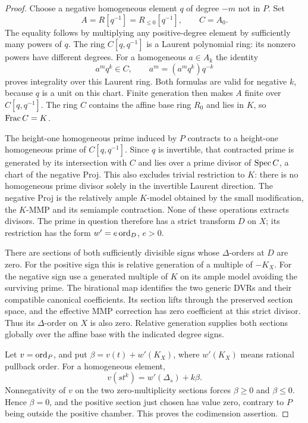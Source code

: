 \begin{proof}
Choose a negative homogeneous element $q$ of degree $-m$ not in $P$.
Set
\[
 A=R[q^{-1}]=R_{\le0}[q^{-1}],\qquad C=A_0.
\]
The equality follows by multiplying any positive-degree element by
sufficiently many powers of $q$.  The ring
$C[q,q^{-1}]$ is a Laurent polynomial ring: its nonzero powers have
different degrees.  For a homogeneous $a\in A_k$ the identity
\begin{equation}\label{eq:H-laurent-integrality}
 a^m q^k\in C,\qquad
 a^m=(a^m q^k)q^{-k}
\end{equation}
proves integrality over this Laurent ring.  Both formulas are valid for
negative $k$, because $q$ is a unit on this chart.  Finite generation
then makes $A$ finite over $C[q,q^{-1}]$.
The ring $C$ contains the affine base ring $R_0$ and lies in $K$, so
$\operatorname{Frac} C=K$.

The height-one homogeneous prime induced by $P$ contracts to a
height-one homogeneous prime of $C[q,q^{-1}]$.  Since $q$ is invertible,
that contracted prime is generated by its intersection with $C$ and
lies over a prime divisor of $\operatorname{Spec} C$, a chart of the negative Proj.
This also excludes trivial restriction to $K$: there is no homogeneous
prime divisor solely in the invertible Laurent direction.  The negative
Proj is the relatively ample $K$-model obtained by the small modification,
the $K$-MMP and its semiample contraction.  None of these operations
extracts divisors.  The prime in question therefore has a strict
transform $D$ on $X$; its restriction has the form
$w'=e\operatorname{ord}_D$, $e>0$.

There are sections of both sufficiently divisible signs whose
$\Delta$-orders at $D$ are zero.  For the positive sign this is relative
generation of a multiple of $-K_X$.  For the negative sign use a
generated multiple of $K$ on its ample model avoiding the surviving
prime.  The birational map identifies the two generic DVRs and their
compatible canonical coefficients.  Its section lifts through the
preserved section space, and the effective MMP correction has zero
coefficient at this strict divisor.  Thus its $\Delta$-order on $X$ is
also zero.  Relative generation supplies both sections globally over
the affine base with the indicated degree signs.

Let $v=\operatorname{ord}_P$, and put
$\beta=v(t)+w'(K_X)$, where $w'(K_X)$ means rational pullback order.
For a homogeneous element,
\begin{equation}\label{eq:H-gauss-order}
 v(s t^k)=w'(\Delta_s)+k\beta.
\end{equation}
Nonnegativity of $v$ on the two zero-multiplicity sections forces
$\beta\ge0$ and $\beta\le0$.  Hence $\beta=0$, and the positive
section just chosen has value zero, contrary to $P$ being outside the
positive chamber.  This proves the codimension assertion.


\end{proof}
